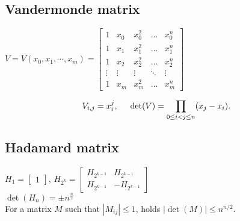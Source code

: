 \subsection*{Vandermonde matrix}
$V = V(x_0, x_1, \cdots, x_m) =
\begin{bmatrix}
1 & x_0 & x_0^2 & \dots & x_0^n\\
1 & x_1 & x_1^2 & \dots & x_1^n\\
1 & x_2 & x_2^2 & \dots & x_2^n\\
\vdots & \vdots & \vdots & \ddots &\vdots \\
1 & x_m & x_m^2 & \dots & x_m^n
\end{bmatrix}$

$$V_{i,j} = x_i^j, \hspace{5mm} \det(V)=\prod_{0\le i<j\le n} (x_j-x_i).$$ 

\subsection*{Hadamard matrix}
$H_{1} = \begin{bmatrix}
     1
 \end{bmatrix}$, \hspace{10mm}
$H_{2^k} = \begin{bmatrix}
     H_{2^{k-1}} &  H_{2^{k-1}}\\
     H_{2^{k-1}} & -H_{2^{k-1}}
  \end{bmatrix}$\\
  
$\det(H_n) = \pm n^{\frac{n}{2}}$\\

For a matrix $M$ such that $|M_{ij}| \le 1$, holds $|\operatorname{det}(M)| \leq n^{n/2}$.
